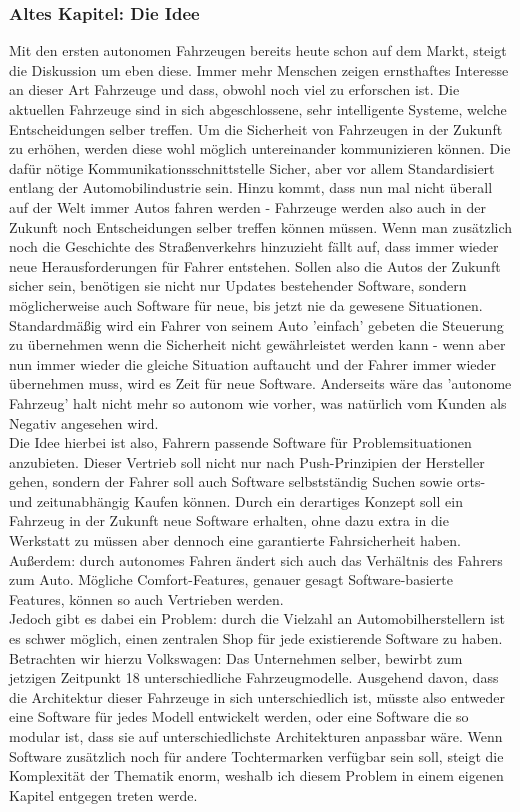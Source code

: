 \subsubsection{Altes Kapitel: Die Idee}
Mit den ersten autonomen Fahrzeugen bereits heute schon auf dem Markt, steigt die Diskussion um eben diese. Immer mehr Menschen zeigen ernsthaftes Interesse an dieser Art Fahrzeuge und dass, obwohl noch viel zu erforschen ist. Die aktuellen Fahrzeuge sind in sich abgeschlossene, sehr intelligente Systeme, welche Entscheidungen selber treffen. Um die Sicherheit von Fahrzeugen in der Zukunft zu erhöhen, werden diese wohl möglich untereinander kommunizieren können. Die dafür nötige Kommunikationsschnittstelle Sicher, aber vor allem Standardisiert entlang der Automobilindustrie sein. Hinzu kommt, dass nun mal nicht überall auf der Welt immer Autos fahren werden - Fahrzeuge werden also auch in der Zukunft noch Entscheidungen selber treffen können müssen. Wenn man zusätzlich noch die Geschichte des Straßenverkehrs hinzuzieht fällt auf, dass immer wieder neue Herausforderungen für Fahrer entstehen. Sollen also die Autos der Zukunft sicher sein, benötigen sie nicht nur Updates bestehender Software, sondern möglicherweise auch Software für neue, bis jetzt nie da gewesene Situationen. Standardmäßig wird ein Fahrer von seinem Auto 'einfach' gebeten die Steuerung zu übernehmen wenn die Sicherheit nicht gewährleistet werden kann - wenn aber nun immer wieder die gleiche Situation auftaucht und der Fahrer immer wieder übernehmen muss, wird es Zeit für neue Software. Anderseits wäre das 'autonome Fahrzeug' halt nicht mehr so autonom wie vorher, was natürlich vom Kunden als Negativ angesehen wird.\\
Die Idee hierbei ist also, Fahrern passende Software für Problemsituationen anzubieten. Dieser Vertrieb soll nicht nur nach Push-Prinzipien\cite{b2} der Hersteller gehen, sondern der Fahrer soll auch Software selbstständig Suchen sowie orts- und zeitunabhängig Kaufen können. Durch ein derartiges Konzept soll ein Fahrzeug in der Zukunft neue Software erhalten, ohne dazu extra in die Werkstatt zu müssen aber dennoch eine garantierte Fahrsicherheit haben. Außerdem: durch autonomes Fahren ändert sich auch das Verhältnis des Fahrers zum Auto. Mögliche Comfort-Features, genauer gesagt Software-basierte Features, können so auch Vertrieben werden.\\
Jedoch gibt es dabei ein Problem: durch die Vielzahl an Automobilherstellern ist es schwer möglich, einen zentralen Shop für jede existierende Software zu haben. Betrachten wir hierzu Volkswagen: Das Unternehmen selber, bewirbt zum jetzigen Zeitpunkt 18 unterschiedliche Fahrzeugmodelle.\cite{b3} Ausgehend davon, dass die Architektur dieser Fahrzeuge in sich unterschiedlich ist, müsste also entweder eine Software für jedes Modell entwickelt werden, oder eine Software die so modular ist, dass sie auf unterschiedlichste Architekturen anpassbar wäre. Wenn Software zusätzlich noch für andere Tochtermarken verfügbar sein soll, steigt die Komplexität der Thematik enorm, weshalb ich diesem Problem in einem eigenen Kapitel entgegen treten werde. \\
